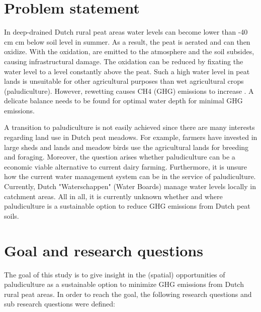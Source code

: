 \documentclass[a4paper,12pt]{scrbook}
\begin{document}
\section{Problem statement}
In deep-drained Dutch rural peat areas water levels can become lower than -40 cm cm below soil level in summer. As a result, the peat is aerated and can then oxidize. With the oxidation,  are emitted to the atmosphere and the soil subsides, causing infrastructural damage. The oxidation can be reduced by fixating the water level to a level constantly above the peat. Such a high water level in peat lands is unsuitable for other agricultural purposes than wet agricultural crops (paludiculture). However, rewetting causes CH4 (GHG) emissions to increase \citep{brouns2016effects}. A delicate balance needs to be found for optimal water depth for minimal GHG emissions. %

A transition to paludiculture is not easily achieved since there are many interests regarding land use in Dutch peat meadows. For example, farmers have invested in large sheds and lands and meadow birds use the agricultural lands for breeding and foraging. Moreover, the question arises whether paludiculture can be a economic viable alternative to current dairy farming. Furthermore, it is unsure how the current water management system can be in the service of paludiculture. Currently, Dutch "Waterschappen" (Water Boards) manage water levels locally in catchment areas. All in all, it is currently unknown whether and where paludiculture is a sustainable option to reduce GHG emissions from Dutch peat soils. 

\section{Goal and research questions}
The goal of this study is to give insight in the (spatial) opportunities of paludiculture as a sustainable option to minimize GHG emissions from Dutch rural peat areas. In order to reach the goal, the following research questions and sub research questions were defined:
\end{document}
